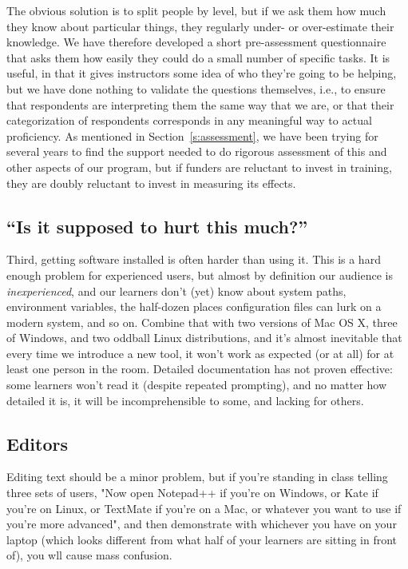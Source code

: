\documentclass[10pt,a4paper,twocolumn]{article}
\begin{document}
The obvious solution is to split people by level, but if we ask them
how much they know about particular things, they regularly under- or
over-estimate their knowledge.  We have therefore developed a short
pre-assessment questionnaire that asks them how easily they could do a
small number of specific tasks.  It is useful, in that it gives
instructors some idea of who they're going to be helping, but we have
done nothing to validate the questions themselves, i.e., to ensure
that respondents are interpreting them the same way that we are, or
that their categorization of respondents corresponds in any meaningful
way to actual proficiency.  As mentioned in Section~\ref{s:assessment},
we have been trying for several years to find the support needed to do
rigorous assessment of this and other aspects of our program, but if
funders are reluctant to invest in training, they are doubly reluctant
to invest in measuring its effects.

\subsection{``Is it supposed to hurt this much?''}\label{s:installation}

Third, getting software installed is often harder than using it. This
is a hard enough problem for experienced users, but almost by
definition our audience is \emph{inexperienced}, and our learners
don't (yet) know about system paths, environment variables, the
half-dozen places configuration files can lurk on a modern system, and
so on. Combine that with two versions of Mac OS X, three of Windows,
and two oddball Linux distributions, and it's almost inevitable that
every time we introduce a new tool, it won't work as expected (or at
all) for at least one person in the room. Detailed documentation has
not proven effective: some learners won't read it (despite repeated
prompting), and no matter how detailed it is, it will be
incomprehensible to some, and lacking for others.

\subsection{Editors}\label{s:editors}

Editing text should be a minor problem, but if you're standing in
class telling three sets of users, "Now open Notepad++ if you're on
Windows, or Kate if you're on Linux, or TextMate if you're on a Mac,
or whatever you want to use if you're more advanced", and then
demonstrate with whichever you have on your laptop (which looks
different from what half of your learners are sitting in front of),
you wll cause mass confusion.
\end{document}
